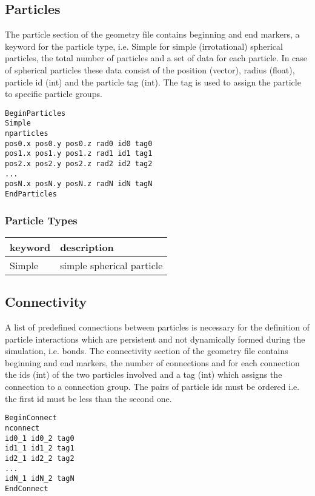 \subsection{Particles}

The particle section of the geometry file contains beginning and end markers, a keyword for the particle type, i.e. \textsf{Simple} for simple (irrotational) spherical particles, the total number of particles and a set of data for each particle. In case of spherical particles these data consist of the position (vector), radius (float), particle id (int)  and the particle tag (int). The tag is used to assign the particle to specific particle groups. 
\begin{verbatim}
BeginParticles
Simple
nparticles
pos0.x pos0.y pos0.z rad0 id0 tag0
pos1.x pos1.y pos1.z rad1 id1 tag1 
pos2.x pos2.y pos2.z rad2 id2 tag2 
...
posN.x posN.y posN.z radN idN tagN 
EndParticles
\end{verbatim}
\subsubsection{Particle Types}
\begin{tabular}[h!]{|l|l|}
\hline
keyword & description \\
\hline
\hline
Simple & simple spherical particle \\
\hline
\end{tabular}


\subsection{Connectivity}

A list of predefined connections between particles is necessary for the definition of particle interactions which are persistent and not dynamically formed during the simulation, i.e. bonds. The connectivity section of the geometry file contains beginning and end markers, the number of connections and for each connection the ids (int) of the two particles involved and a tag (int) which assigns the connection to a connection group. The pairs of particle ids must be ordered i.e. the first id must be less than the second one.
\begin{verbatim}
BeginConnect
nconnect
id0_1 id0_2 tag0
id1_1 id1_2 tag1
id2_1 id2_2 tag2
...
idN_1 idN_2 tagN
EndConnect
\end{verbatim}
\label{sec:prp}
